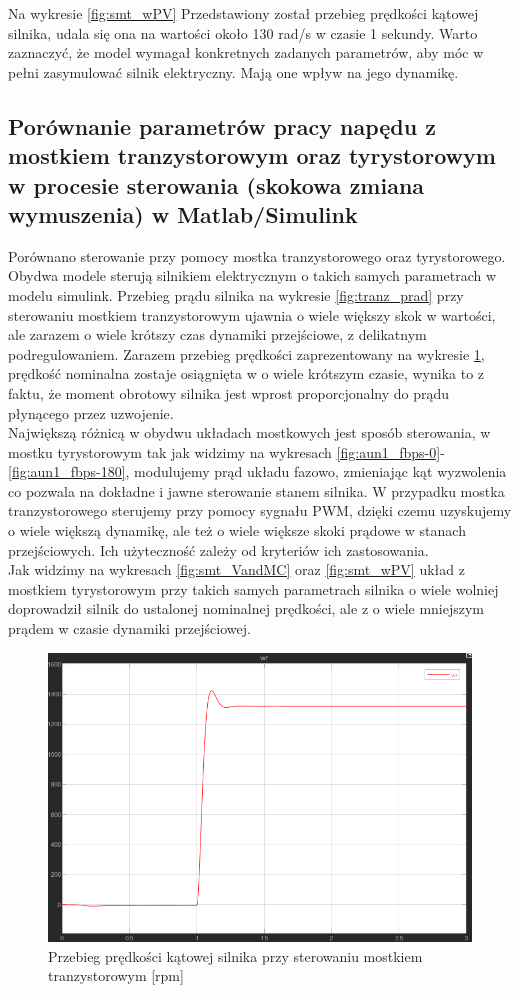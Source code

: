 \documentclass[11pt]{article}
\begin{document}
Na wykresie \ref{fig:smt_wPV} Przedstawiony został przebieg prędkości kątowej silnika, udala się ona na wartości około 130 rad/s w czasie 1 sekundy. Warto zaznaczyć, że model wymagał konkretnych zadanych parametrów, aby móc w pełni zasymulować silnik elektryczny. Mają one wpływ na jego dynamikę.
\subsection{Porównanie parametrów pracy napędu z mostkiem tranzystorowym oraz tyrystorowym w procesie sterowania (skokowa zmiana wymuszenia) w Matlab/Simulink}
Porównano sterowanie przy pomocy mostka tranzystorowego oraz tyrystorowego. Obydwa modele sterują silnikiem elektrycznym o takich samych parametrach w modelu simulink. Przebieg prądu silnika na wykresie \ref{fig:tranz_prad} przy sterowaniu mostkiem tranzystorowym ujawnia o wiele większy skok w wartości, ale zarazem o wiele krótszy czas dynamiki przejściowe, z delikatnym podregulowaniem. Zarazem przebieg prędkości zaprezentowany na wykresie \ref{fig:tranz_predkosc}, prędkość nominalna zostaje osiągnięta w o wiele krótszym czasie, wynika to z faktu, że moment obrotowy silnika jest wprost proporcjonalny do prądu płynącego przez uzwojenie. \\
Największą różnicą w obydwu układach mostkowych jest sposób sterowania, w mostku tyrystorowym tak jak widzimy na wykresach \ref{fig:aun1_fbps-0}-\ref{fig:aun1_fbps-180}, modulujemy prąd układu fazowo, zmieniając kąt wyzwolenia co pozwala na dokładne i jawne sterowanie stanem silnika. W przypadku mostka tranzystorowego sterujemy przy pomocy sygnału PWM, dzięki czemu uzyskujemy o wiele większą dynamikę, ale też o wiele większe skoki prądowe w stanach przejściowych. Ich użyteczność zależy od kryteriów ich zastosowania.\\ Jak widzimy na wykresach \ref{fig:smt_VandMC} oraz \ref{fig:smt_wPV} układ z mostkiem tyrystorowym przy takich samych parametrach silnika o wiele wolniej doprowadził silnik do ustalonej nominalnej prędkości, ale z o wiele mniejszym prądem w czasie dynamiki przejściowej.
\begin{figure}[H]
    \centering
    \includegraphics[width=0.9\linewidth]{aun1_tranz_predkosc.png}
    \caption{Przebieg prędkości kątowej silnika przy sterowaniu mostkiem tranzystorowym [rpm]}
    \label{fig:tranz_predkosc}
\end{figure}
\end{document}
